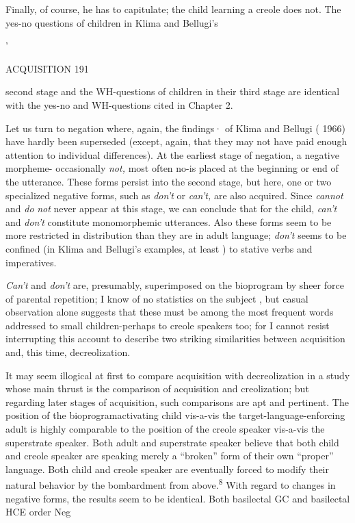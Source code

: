 Finally, of course, he has to capitulate; the child learning a creole does not. The yes-no questions of children in Klima and Bellugi's

'

ACQUISITION 191

second stage and the WH-questions of children in their third stage are identical with the yes-no and WH-questions cited in Chapter 2.

Let us turn to negation where, again, the findings· of Klima and Bellugi ( 1966) have hardly been superseded (except, again, that they may not have paid enough attention to individual differences). At the earliest stage of negation, a negative morpheme- occasionally \textit{not,} most often no-is placed at the beginning or end of the utterance. These forms persist into the second stage, but here, one or two spe\-cialized negative forms, such as \textit{don't} or \textit{can't,} are also acquired. Since \textit{cannot} and \textit{do} \textit{not} never appear at this stage, we can conclude that for the child, \textit{can't} and \textit{don't} constitute monomorphemic utterances. Also these forms seem to be more restricted in distribution than they are in adult language; \textit{don't} seems to be confined (in Klima and Bellugi's examples, at least ) to stative verbs and imperatives.

\textit{Can't} and \textit{don't} are, presumably, superimposed on the bio\-program by sheer force of parental repetition; I know of no statistics on the subject , but casual observation alone suggests that these must be among the most frequent words addressed to small children-perhaps to creole speakers too; for I cannot resist interrupting this account to describe two striking similarities between acquisition and, this time, decreolization.

It may seem illogical at first to compare acquisition with de\-creolization in a study whose main thrust is the comparison of acquisi\-tion and creolization; but regarding later stages of acquisition, such comparisons are apt and pertinent. The position of the bioprogram\-activating child vis-a-vis the target-language-enforcing adult is highly comparable to the position of the creole speaker vis-a-vis the super\-strate speaker. Both adult and superstrate speaker believe that both child and creole speaker are speaking merely a ``broken'' form of their own ``proper'' language. Both child and creole speaker are eventually forced to modify their natural behavior by the bombardment from above.\textsuperscript{8} With regard to changes in negative forms, the results seem to be identical. Both basilectal GC and basilectal HCE order Neg

